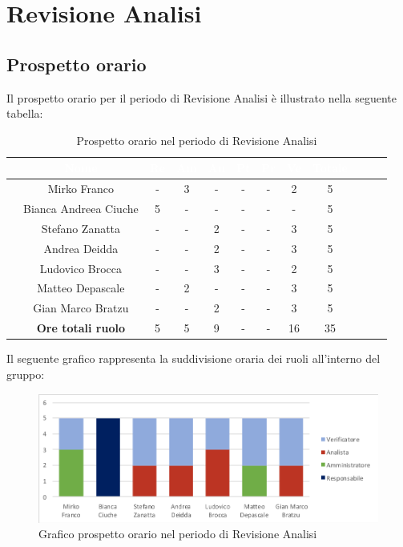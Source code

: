 \newpage

\section{Revisione Analisi}
\subsection{Prospetto orario}
Il prospetto orario per il periodo di Revisione Analisi è illustrato nella seguente tabella:

\begin{table}[ht]
	\begin{center}
		\begin{tabular}{cccccccccccc}
			\rowcolor{coolblack}
			\hline 
			& \textcolor{white}{Nome} & \textcolor{white}{Re} & \textcolor{white}{Am} & \textcolor{white}{An} & \textcolor{white}{Pt} &\textcolor{white}{Pr} & \textcolor{white}{Ve} & \textcolor{white}{Totale} \\
			\hline
			
			&Mirko Franco          & - & 3 & - & - & - & 2 &5  \\
			&Bianca Andreea Ciuche        & 5  & - & - & - & - & - & 5 \\
			&Stefano Zanatta     & -& - & 2 & - & - & 3&5 \\
			&Andrea Deidda       &  -& - & 2 & - & - & 3 &5 \\
			&Ludovico Brocca    & -& -& 3 & - & - & 2 & 5 \\
			&Matteo Depascale  & -& 2& -& - & - & 3 & 5 \\
			&Gian Marco Bratzu & -& - & 2 & - & - & 3& 5 \\
			\hline
			&\textbf{Ore totali ruolo} & 5 & 5 & 9 & - & - & 16 & 35 \\
		\end{tabular}
		\caption{Prospetto orario nel periodo di Revisione Analisi}
	\end{center}
\end{table}

Il seguente grafico rappresenta la suddivisione oraria dei ruoli all'interno del gruppo:
\begin{figure}[!ht]
	\begin{center}
		\includegraphics{images/grafoProspettoOrarioDett.png}
		\caption{Grafico prospetto orario nel periodo di Revisione Analisi }
	\end{center}
\end{figure}
\newpage
